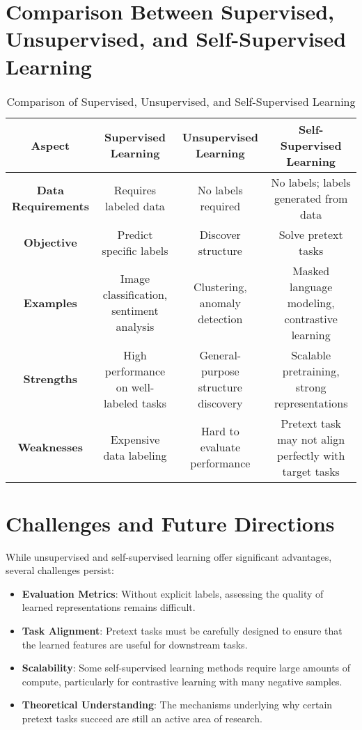 \documentclass[openany]{book}
\begin{document}
\section{Comparison Between Supervised, Unsupervised, and Self-Supervised Learning}
\begin{table}[h!]
\centering
\begin{tabular}{|c|c|c|c|}
\hline
\textbf{Aspect} & \textbf{Supervised Learning} & 
\textbf{Unsupervised Learning} & \textbf{Self-Supervised Learning} \\
\hline
\textbf{Data Requirements} & Requires labeled data & No labels required & 
No labels; labels generated from data \\
\hline
\textbf{Objective} & Predict specific labels & Discover structure & 
Solve pretext tasks \\
\hline
\textbf{Examples} & Image classification, sentiment analysis & 
Clustering, anomaly detection & Masked language modeling, contrastive 
learning \\
\hline
\textbf{Strengths} & High performance on well-labeled tasks & 
General-purpose structure discovery & Scalable pretraining, strong 
representations \\
\hline
\textbf{Weaknesses} & Expensive data labeling & Hard to evaluate 
performance & Pretext task may not align perfectly with target tasks \\
\hline
\end{tabular}
\caption{Comparison of Supervised, Unsupervised, and Self-Supervised Learning}
\end{table}

\section{Challenges and Future Directions}
While unsupervised and self-supervised learning offer significant advantages, 
several challenges persist:
\begin{itemize}
    \item \textbf{Evaluation Metrics}: Without explicit labels, assessing the 
    quality of learned representations remains difficult.
    \item \textbf{Task Alignment}: Pretext tasks must be carefully designed to 
    ensure that the learned features are useful for downstream tasks.
    \item \textbf{Scalability}: Some self-supervised learning methods require 
    large amounts of compute, particularly for contrastive learning with many 
    negative samples.
    \item \textbf{Theoretical Understanding}: The mechanisms underlying why 
    certain pretext tasks succeed are still an active area of research.
\end{itemize}
\end{document}
